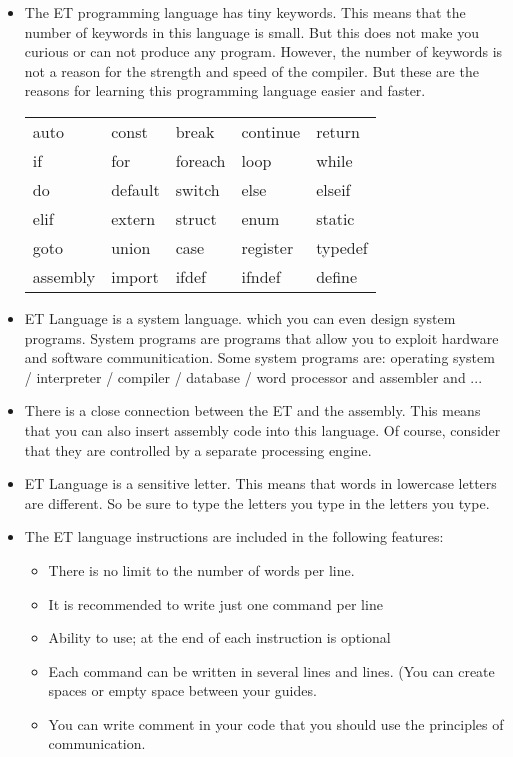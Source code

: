 \documentclass[11pt,fleqn]{book}
\begin{document}
\begin{itemize}
		\item The ET programming language has tiny keywords. This means that the number of keywords in this language is small. But this does not make you curious or can not produce any program.
		However, the number of keywords is not a reason for the strength and speed of the compiler. But these are the reasons for learning this programming language easier and faster. \begin{table}[]
			\centering
	\begin{tabular}{|lllll|}
\hline
	auto	& const & break & continue & return \\
	if	& for  & foreach & loop & while \\
	do	& default & switch & else & elseif \\
	elif	& extern & struct & enum & static \\
	goto & union & case & register & typedef\\
	assembly & import & ifdef & ifndef & define \\ \hline
	
	\end{tabular}
\end{table}


\pagebreak

	
	
	\item ET Language is a system language. which you can even design system programs. System programs are programs that allow you to exploit hardware and software communitication. Some system programs are: operating system / interpreter / compiler / database / word processor and assembler and ...
	
	\item There is a close connection between the ET and the assembly.
	This means that you can also insert assembly code into this language.
	Of course, consider that they are controlled by a separate processing engine.
	
	\item ET Language is a sensitive letter.
	This means that words in lowercase letters are different.
	So be sure to type the letters you type in the letters you type.
	
	\item The ET language instructions are included in the following features:
	
	\begin{itemize}
	\item There is no limit to the number of words per line.
	\item It is recommended to write just one command per line
	\item Ability to use; at the end of each instruction is optional
	\item Each command can be written in several lines and lines. (You can create spaces or empty space between your guides.

\item You can write comment in your code that you should use the principles of communication.	
	\end{itemize}

	

\end{itemize}
\end{document}
